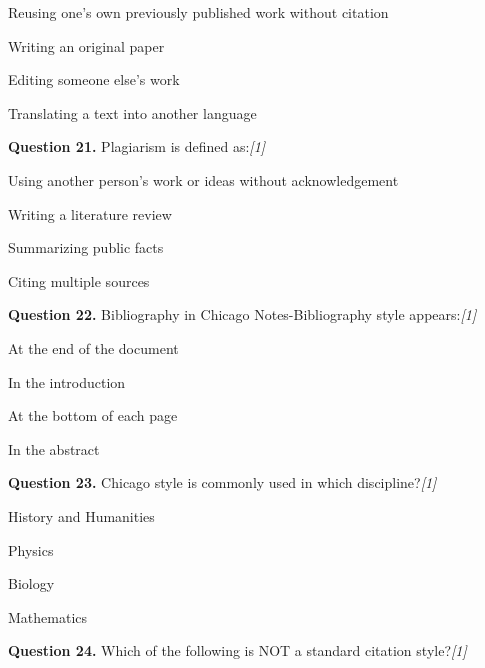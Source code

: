 \documentclass[11pt,a4paper]{article}
\newcommand{\pts}[1]{\hfill   \textit{[#1]}}
\begin{document}
\begin{parts}
  \item Reusing one's own previously published work without citation
  \item Writing an original paper
  \item Editing someone else's work
  \item Translating a text into another language
\end{parts}

\medskip




\noindent   \textbf{Question 21.} Plagiarism is defined as:\pts{1}

\begin{parts}
  \item Using another person's work or ideas without acknowledgement
  \item Writing a literature review
  \item Summarizing public facts
  \item Citing multiple sources
\end{parts}

\medskip




\noindent   \textbf{Question 22.} Bibliography in Chicago Notes-Bibliography style appears:\pts{1}

\begin{parts}
  \item At the end of the document
  \item In the introduction
  \item At the bottom of each page
  \item In the abstract
\end{parts}

\medskip




\noindent   \textbf{Question 23.} Chicago style is commonly used in which discipline?\pts{1}

\begin{parts}
  \item History and Humanities
  \item Physics
  \item Biology
  \item Mathematics
\end{parts}

\medskip




\noindent   \textbf{Question 24.} Which of the following is NOT a standard citation style?\pts{1}
\end{document}
